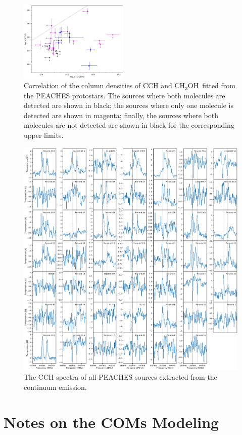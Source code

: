 \documentclass[twocolumn]{aastex62}
\newcommand{\methanol}{\mbox{CH$_{3}$OH}}
\begin{document}
\begin{figure}[htbp!]
  \centering
  \includegraphics[width=0.47\textwidth]{Ncol_ch3oh_cch.pdf}
  \caption{Correlation of the column densities of CCH and \methanol\ fitted from the PEACHES protostars.  The sources where both molecules are detected are shown in black; the sources where only one molecule is detected are shown in magenta; finally, the sources where both molecules are not detected are shown in black for the corresponding upper limits.}
  \label{fig:cch_ch3oh}
\end{figure}

\begin{figure}[htbp!]
  \centering
  \includegraphics[width=\textwidth]{all_cch.pdf}
  \caption{The CCH spectra of all PEACHES sources extracted from the continuum emission.}
  \label{fig:all_cch}
\end{figure}

\section{Notes on the COMs Modeling}



\end{document}
